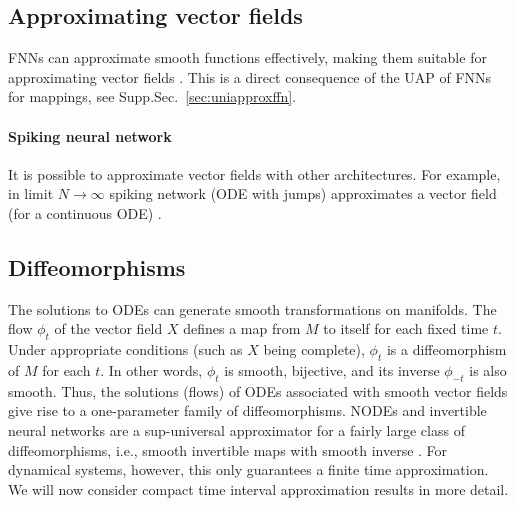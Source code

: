 \documentclass{article}
\theoremstyle{definition}
\theoremstyle{remark}
\newcounter{ct}
\begin{document}
\subsection{Approximating vector fields}\label{sec:uapvfs}
 FNNs can approximate smooth functions effectively, making them suitable for approximating vector fields \citep{doya1993universality}.
This is a direct consequence of the UAP of FNNs for mappings, see Supp.Sec.~\ref{sec:uniapproxffn}.



\paragraph{Spiking neural network}
It is possible to approximate vector fields with other architectures.
For example, in limit $N\rightarrow\infty$ spiking network (ODE with jumps) approximates a vector field (for a continuous ODE) \citep{podlaski2024approximating}. 


\subsection{Diffeomorphisms}%
The solutions to ODEs can generate smooth transformations on manifolds.
The flow \( \phi_t \) of the vector field \( X \) defines a map from \( M \) to itself for each fixed time \( t \). Under appropriate conditions (such as \( X \) being complete), \( \phi_t \) is a diffeomorphism of \( M \) for each \( t \). In other words, \( \phi_t \) is smooth, bijective, and its inverse \( \phi_{-t} \) is also smooth.
Thus, the solutions (flows) of ODEs associated with smooth vector fields give rise to a one-parameter family of diffeomorphisms.
%
NODEs and invertible neural networks are a sup-universal approximator for a fairly large class of diffeomorphisms, i.e., smooth invertible maps with smooth inverse \citep{huang2018neural, jaini2019sum, teshima2020uap, teshima2020coupling, ishikawa2023uap}.
For dynamical systems, however, this only guarantees a finite time approximation.
We will now consider compact time interval approximation results in more detail.
\end{document}
